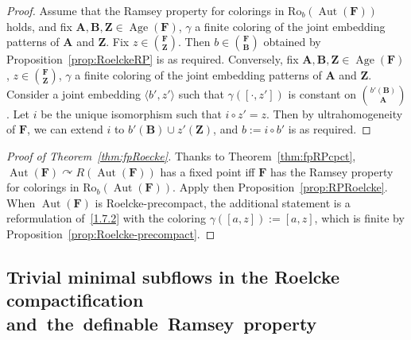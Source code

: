 \documentclass[11pt]{article}
\theoremstyle{definition}
\numberwithin{equation}{section}
\numberwithin{figure}{section}
\numberwithin{table}{section}
\newcommand*{\mA}{\mathbf{A}}
\newcommand*{\mB}{\mathbf{B}}
\newcommand*{\mF}{\mathbf{F}}
\newcommand*{\mZ}{\mathbf{Z}}
\DeclareMathOperator{\Aut}{Aut}
\DeclareMathOperator{\Age}{Age}
\newcommand{\actson}{\curvearrowright}
\newcommand{\ROB}{\mathrm{Ro}_{b}}
\begin{document}
\begin{proof}
Assume that the Ramsey property for colorings in $\ROB(\Aut(\mF))$ holds, and fix $\mA, \mB, \mZ\in \Age(\mF)$, $\gamma$ a finite coloring of the joint embedding patterns of $\mA$ and $\mZ$. Fix $z\in \binom{\mF}{\mZ}$. Then $b\in \binom{\mF}{\mB}$ obtained by Proposition~\ref{prop:RoelckeRP} is as required. Conversely, fix $\mA, \mB, \mZ\in \Age(\mF)$, $z\in \binom{\mF}{\mZ}$, $\gamma$ a finite coloring of the joint embedding patterns of $\mA$ and $\mZ$. Consider a joint embedding $\langle b',z'\rangle$ such that $\gamma([\cdot,z'])$ is constant on $\binom{b'(\mB)}{\mA}$. Let $i$ be the unique isomorphism such that $i\circ z'=z$. Then by ultrahomogeneity of $\mF$, we can extend $i$ to $b'(\mB)\cup z'(\mZ)$, and $b:=i\circ b'$ is as required.
\end{proof}

\begin{proof}[Proof of Theorem~\ref{thm:fpRoecke}]
Thanks to Theorem~\ref{thm:fpRPcpct}, $\Aut(\mF)\actson R(\Aut(\mF))$ has a fixed point iff $\mF$ has the Ramsey property for colorings in $\ROB(\Aut(\mF))$. Apply then Proposition~\ref{prop:RPRoelcke}. When $\Aut(\mF)$ is Roelcke-precompact, the additional statement is a reformulation of~\eqref{1.7.2} with the coloring $\gamma([a,z]):=[a,z]$, which is finite by Proposition~\ref{prop:Roelcke-precompact}.
\end{proof}

\subsection{Trivial minimal subflows in the Roelcke compactification and~the~definable~Ramsey~property}
\label{subsection:defRP}
\end{document}
